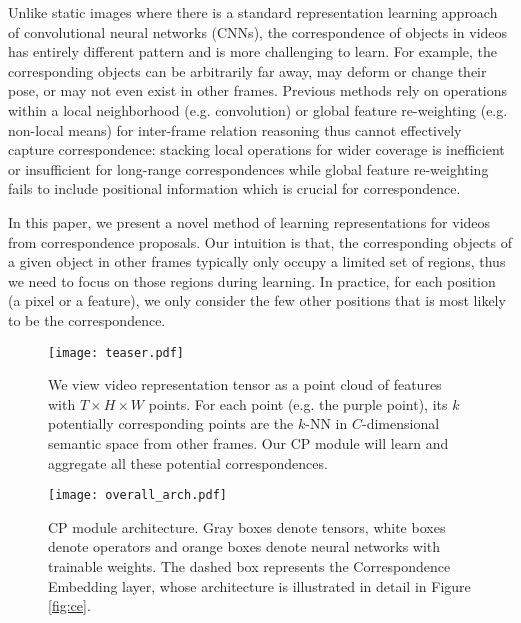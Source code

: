 \documentclass[10pt,twocolumn,letterpaper]{article}
\begin{document}
Unlike static images where there is a standard representation learning approach of convolutional neural networks (CNNs),  the correspondence of objects in videos has entirely different pattern and is more challenging to learn. For example, the corresponding objects can be arbitrarily far away, may deform or change their pose, or may not even exist in other frames. Previous methods rely on operations within a local neighborhood (e.g. convolution) or global feature re-weighting (e.g. non-local means) for inter-frame relation reasoning thus cannot effectively capture correspondence: stacking local operations for wider coverage is inefficient or insufficient for long-range correspondences while global feature re-weighting fails to include positional information which is crucial for correspondence.

In this paper, we present a novel method of learning representations for videos from  correspondence proposals. Our intuition is that, the corresponding objects of a given object in other frames typically only occupy a limited set of regions, thus we need to focus on those regions during learning. In practice, for each position (a pixel or a feature), we only consider the few other positions that is most likely to be the correspondence.

\begin{figure}[t]
\centering
\texttt{[image: teaser.pdf]}
\centering
\vspace{-2ex}
\caption{We view video representation tensor as a point cloud of features with $T\times H\times W$ points. For each point (e.g. the purple point), its $k$ potentially corresponding points are the $k$-NN in $C$-dimensional semantic space from other frames. Our CP module will learn and aggregate all these potential correspondences.}
\label{fig:teaser}
\vspace{-2ex}
\end{figure}


\begin{figure*}[t]
\centering
\texttt{[image: overall\_arch.pdf]}
\caption{CP module architecture. Gray boxes denote tensors, white boxes denote operators and orange boxes denote neural networks with trainable weights. The dashed box represents the Correspondence Embedding layer, whose  architecture is illustrated in detail in Figure \ref{fig:ce}.}
\label{fig:overall_arch}
\vspace{-2ex}
\end{figure*}
\end{document}
